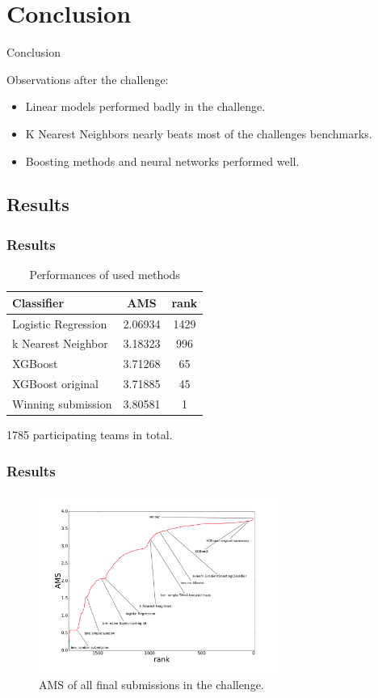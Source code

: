 \section{Conclusion}
\begin{frame}
	\begin{center}
	\Large{Conclusion}
	\end{center}
\end{frame}


\begin{frame}
	Observations after the challenge:
	\begin{itemize}
		\item Linear models performed badly in the challenge.
		\item K Nearest Neighbors nearly beats most of the challenges benchmarks.
		\item Boosting methods and neural networks performed well.
	\end{itemize}
\end{frame}

\subsection{Results}
\begin{frame}
	\frametitle{Results}
	\begin{table}[width=\textwidth]
	\begin{tabular}{|l|c|c|}
	\hline
	Classifier & AMS & rank \\
	\hline
	Logistic Regression & 2.06934 & 1429 \\
	\hline
	k Nearest Neighbor & 3.18323 & 996 \\
	\hline
	XGBoost & 3.71268 & 65 \\
	\hline
	XGBoost original & 3.71885 & 45 \\
	\hline
	Winning submission & 3.80581 & 1 \\
	\hline
	\end{tabular}
	\caption{Performances of used methods}
	\end{table}
	\vspace{2ex}
	\begin{center}
		1785 participating teams in total.	
	\end{center}

\end{frame}

\begin{frame}
	\frametitle{Results}
	\begin{figure}
		\includegraphics[trim=50 50 50 75,clip,width=0.7\textwidth]{images/amscompare}
		\caption{AMS of all final submissions in the challenge. \cite{higgsChallenge}}
	\end{figure}
\end{frame}
